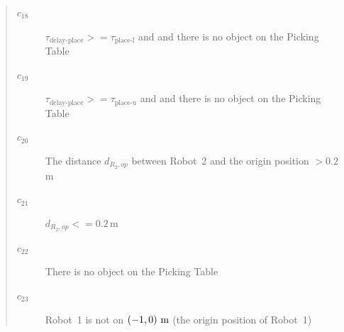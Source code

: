 \documentclass[english, 12pt, a4paper, elec, utf8, a-2b, online]{aaltothesis}
\begin{document}
\begin{quote}
\begin{description}
    \item[$c_{18}$] $\tau_\text{delay-place} >= \tau_\text{place-l}$ and and there is no object on the Picking Table
    \item[$c_{19}$] $\tau_\text{delay-place} >= \tau_\text{place-u}$ and and there is no object on the Picking Table
    \item[$c_{20}$] The distance $d_{R_2,op}$ between Robot~2 and the origin position $ > 0.2$ m
    \item[$c_{21}$] $d_{R_2,op} <= 0.2$\,m
    \item[$c_{22}$] There is no object on the Picking Table
    \item[$c_{23}$] Robot~1 is not on $(-1, 0)\,\text{\,m}$ (the origin position of Robot~1)
\end{description}
\end{quote}
\end{document}
